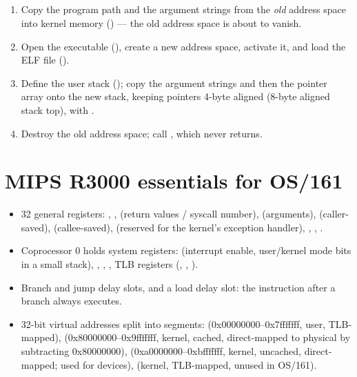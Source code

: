 \subsection*{}
\begin{enumerate}
  \item Copy the program path and the argument strings from the \emph{old} address space into
    kernel memory () --- the old address space is about to vanish.
  \item Open the executable (), create a new address space, activate it, and
    load the ELF file ().
  \item Define the user stack (); copy the argument strings and then the
     pointer array onto the new stack, keeping pointers 4-byte aligned (8-byte aligned
    stack top), with .
  \item Destroy the old address space; call , which never returns.
\end{enumerate}

\section{MIPS R3000 essentials for OS/161}
\begin{itemize}
  \item 32 general registers: , ,  (return values / syscall
    number),  (arguments),  (caller-saved), 
    (callee-saved),  (reserved for the kernel's exception handler), ,
    , .
  \item Coprocessor 0 holds system registers:  (interrupt enable, user/kernel mode
    bits in a small stack), , , , TLB registers
    (, , ).
  \item Branch and jump delay slots, and a load delay slot: the instruction after a branch
    always executes.
  \item 32-bit virtual addresses split into segments:  (0x00000000--0x7fffffff,
    user, TLB-mapped),  (0x80000000--0x9fffffff, kernel, cached, direct-mapped to
    physical by subtracting 0x80000000),  (0xa0000000--0xbfffffff, kernel,
    uncached, direct-mapped; used for devices),  (kernel, TLB-mapped, unused in
    OS/161).
\end{itemize}

